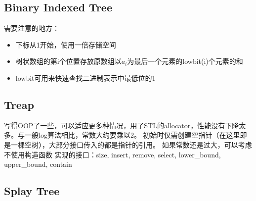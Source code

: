	\subsection{Binary Indexed Tree}
		\begin{flushleft}
			需要注意的地方：
			\begin{itemize}
				\item 下标从1开始，使用一倍存储空间
				\item 树状数组的第i个位置存放原数组以$a_{i}$为最后一个元素的lowbit(i)个元素的和
				\item lowbit可用来快速查找二进制表示中最低位的1
			\end{itemize}
		\end{flushleft}
		
	\newpage
	\subsection{Treap}
		\begin{flushleft}
			写得OOP了一些，可以适应更多种情况，用了STL的allocator，性能没有下降太多。与一般log算法相比，常数大约要乘以2。
			\linebreak 初始时仅需创建空指针（在这里即是一棵空树），大部分接口传入的都是指针的引用。
			\linebreak 如果常数还是过大，可以考虑不使用构造函数
			\linebreak 实现的接口：size, insert, remove, select, lower\_bound, upper\_bound, contain
		\end{flushleft}
		
	\newpage
	\subsection{Splay Tree}
		
